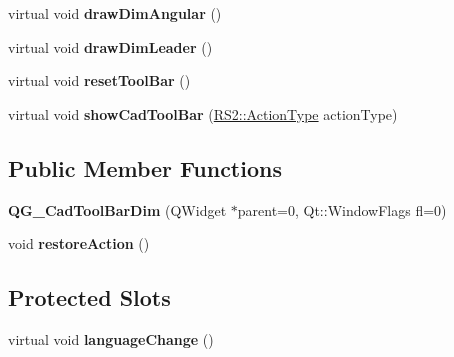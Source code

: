 \begin{DoxyCompactItemize}
\item 
\hypertarget{classQG__CadToolBarDim_af7c2c7ee202b3b674e46b047241aa2f8}{virtual void {\bfseries draw\-Dim\-Angular} ()}\label{classQG__CadToolBarDim_af7c2c7ee202b3b674e46b047241aa2f8}

\item 
\hypertarget{classQG__CadToolBarDim_a1dab22afadfda853aa21f58a8ede5f43}{virtual void {\bfseries draw\-Dim\-Leader} ()}\label{classQG__CadToolBarDim_a1dab22afadfda853aa21f58a8ede5f43}

\item 
\hypertarget{classQG__CadToolBarDim_a170cd316702b76495997919e9cb05e5f}{virtual void {\bfseries reset\-Tool\-Bar} ()}\label{classQG__CadToolBarDim_a170cd316702b76495997919e9cb05e5f}

\item 
\hypertarget{classQG__CadToolBarDim_aec4b1fe03d9b5895b3181c64471a24c9}{virtual void {\bfseries show\-Cad\-Tool\-Bar} (\hyperlink{classRS2_afe3523e0bc41fd637b892321cfc4b9d7}{R\-S2\-::\-Action\-Type} action\-Type)}\label{classQG__CadToolBarDim_aec4b1fe03d9b5895b3181c64471a24c9}

\end{DoxyCompactItemize}
\subsection*{Public Member Functions}
\begin{DoxyCompactItemize}
\item 
\hypertarget{classQG__CadToolBarDim_af92caa6f9515674d6b77430e51ca0b8a}{{\bfseries Q\-G\-\_\-\-Cad\-Tool\-Bar\-Dim} (Q\-Widget $\ast$parent=0, Qt\-::\-Window\-Flags fl=0)}\label{classQG__CadToolBarDim_af92caa6f9515674d6b77430e51ca0b8a}

\item 
\hypertarget{classQG__CadToolBarDim_aa31f904a6947a28e5dba41de20cdf716}{void {\bfseries restore\-Action} ()}\label{classQG__CadToolBarDim_aa31f904a6947a28e5dba41de20cdf716}

\end{DoxyCompactItemize}
\subsection*{Protected Slots}
\begin{DoxyCompactItemize}
\item 
\hypertarget{classQG__CadToolBarDim_a3f2de473fec4751d472b8031283639b1}{virtual void {\bfseries language\-Change} ()}\label{classQG__CadToolBarDim_a3f2de473fec4751d472b8031283639b1}

\end{DoxyCompactItemize}
